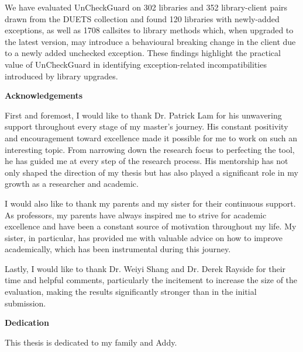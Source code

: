       We have evaluated UnCheckGuard on 302 libraries and 352 library-client pairs drawn from the DUETS collection
      and found 120 libraries with newly-added exceptions, as well as 1708 callsites to library methods which,
      when upgraded to the latest version, may introduce
      a behavioural breaking change in the client due to a newly added unchecked exception. These findings
      highlight the practical value of UnCheckGuard in identifying exception-related incompatibilities
      introduced by library upgrades.

\cleardoublepage
{}    %

\begin{center}\textbf{Acknowledgements}\end{center}

First and foremost, I would like to thank Dr. Patrick Lam for his unwavering support throughout every stage of my master's journey. His constant positivity and encouragement toward excellence made it possible for me to work on such an interesting topic. From narrowing down the research focus to perfecting the tool, he has guided me at every step of the research process. His mentorship has not only shaped the direction of my thesis but has also played a significant role in my growth as a researcher and academic.

I would also like to thank my parents and my sister for their continuous support. As professors, my parents have always inspired me to strive for academic excellence and have been a constant source of motivation throughout my life. My sister, in particular, has provided me with valuable advice on how to improve academically, which has been instrumental during this journey.

Lastly, I would like to thank Dr. Weiyi Shang and Dr. Derek Rayside for their time and helpful comments, particularly the incitement to increase the size of the evaluation, making the results significantly stronger than in the initial submission.
\cleardoublepage
{}    %


\begin{center}\textbf{Dedication}\end{center}
This thesis is dedicated to my family and Addy.
\cleardoublepage
{}    %



